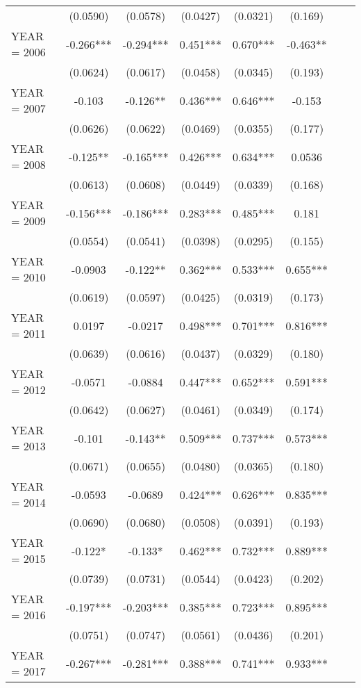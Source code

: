 \begin{tabular}{lccccccc}
 & (0.0590) & (0.0578) & (0.0427) & (0.0321) & (0.169) &  &  \\
YEAR = 2006 & -0.266*** & -0.294*** & 0.451*** & 0.670*** & -0.463** &  &  \\
 & (0.0624) & (0.0617) & (0.0458) & (0.0345) & (0.193) &  &  \\
YEAR = 2007 & -0.103 & -0.126** & 0.436*** & 0.646*** & -0.153 &  &  \\
 & (0.0626) & (0.0622) & (0.0469) & (0.0355) & (0.177) &  &  \\
YEAR = 2008 & -0.125** & -0.165*** & 0.426*** & 0.634*** & 0.0536 &  &  \\
 & (0.0613) & (0.0608) & (0.0449) & (0.0339) & (0.168) &  &  \\
YEAR = 2009 & -0.156*** & -0.186*** & 0.283*** & 0.485*** & 0.181 &  &  \\
 & (0.0554) & (0.0541) & (0.0398) & (0.0295) & (0.155) &  &  \\
YEAR = 2010 & -0.0903 & -0.122** & 0.362*** & 0.533*** & 0.655*** &  &  \\
 & (0.0619) & (0.0597) & (0.0425) & (0.0319) & (0.173) &  &  \\
YEAR = 2011 & 0.0197 & -0.0217 & 0.498*** & 0.701*** & 0.816*** &  &  \\
 & (0.0639) & (0.0616) & (0.0437) & (0.0329) & (0.180) &  &  \\
YEAR = 2012 & -0.0571 & -0.0884 & 0.447*** & 0.652*** & 0.591*** &  &  \\
 & (0.0642) & (0.0627) & (0.0461) & (0.0349) & (0.174) &  &  \\
YEAR = 2013 & -0.101 & -0.143** & 0.509*** & 0.737*** & 0.573*** &  &  \\
 & (0.0671) & (0.0655) & (0.0480) & (0.0365) & (0.180) &  &  \\
YEAR = 2014 & -0.0593 & -0.0689 & 0.424*** & 0.626*** & 0.835*** &  &  \\
 & (0.0690) & (0.0680) & (0.0508) & (0.0391) & (0.193) &  &  \\
YEAR = 2015 & -0.122* & -0.133* & 0.462*** & 0.732*** & 0.889*** &  &  \\
 & (0.0739) & (0.0731) & (0.0544) & (0.0423) & (0.202) &  &  \\
YEAR = 2016 & -0.197*** & -0.203*** & 0.385*** & 0.723*** & 0.895*** &  &  \\
 & (0.0751) & (0.0747) & (0.0561) & (0.0436) & (0.201) &  &  \\
YEAR = 2017 & -0.267*** & -0.281*** & 0.388*** & 0.741*** & 0.933*** &  &  \\

\end{tabular}
